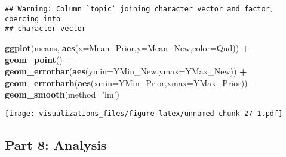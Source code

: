 \documentclass[]{article}
\newenvironment{Shaded}{\begin{snugshade}}{\end{snugshade}}
\newcommand{\KeywordTok}[1]{\textcolor[rgb]{0.13,0.29,0.53}{\textbf{#1}}}
\newcommand{\DataTypeTok}[1]{\textcolor[rgb]{0.13,0.29,0.53}{#1}}
\newcommand{\StringTok}[1]{\textcolor[rgb]{0.31,0.60,0.02}{#1}}
\newcommand{\OperatorTok}[1]{\textcolor[rgb]{0.81,0.36,0.00}{\textbf{#1}}}
\newcommand{\NormalTok}[1]{#1}
\begin{document}
\begin{verbatim}
## Warning: Column `topic` joining character vector and factor, coercing into
## character vector
\end{verbatim}

\begin{Shaded}
\begin{Highlighting}[]
\KeywordTok{ggplot}\NormalTok{(means, }\KeywordTok{aes}\NormalTok{(}\DataTypeTok{x=}\NormalTok{Mean_Prior,}\DataTypeTok{y=}\NormalTok{Mean_New,}\DataTypeTok{color=}\NormalTok{Qud)) }\OperatorTok{+}
\StringTok{  }\KeywordTok{geom_point}\NormalTok{() }\OperatorTok{+}
\StringTok{  }\KeywordTok{geom_errorbar}\NormalTok{(}\KeywordTok{aes}\NormalTok{(}\DataTypeTok{ymin=}\NormalTok{YMin_New,}\DataTypeTok{ymax=}\NormalTok{YMax_New)) }\OperatorTok{+}\StringTok{ }
\StringTok{  }\KeywordTok{geom_errorbarh}\NormalTok{(}\KeywordTok{aes}\NormalTok{(}\DataTypeTok{xmin=}\NormalTok{YMin_Prior,}\DataTypeTok{xmax=}\NormalTok{YMax_Prior)) }\OperatorTok{+}\StringTok{ }
\StringTok{  }\KeywordTok{geom_smooth}\NormalTok{(}\DataTypeTok{method=}\StringTok{'lm'}\NormalTok{)}
\end{Highlighting}
\end{Shaded}

\texttt{[image: visualizations\_files/figure-latex/unnamed-chunk-27-1.pdf]}

\subsection{Part 8: Analysis}\label{part-8-analysis}

\begin{Shaded}
\end{Shaded}
\end{document}
